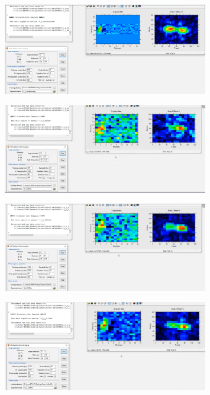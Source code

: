 \begin{figure}[H]
    \centering
    \includegraphics[width = 0.8\textwidth]{Screenshot2/14_2ersteMessung.jpg}
\end{figure}

\begin{figure}[H]
    \centering
    \includegraphics[width = 0.8\textwidth]{Screenshot2/14_2_600ms.jpg}
\end{figure}

\begin{figure}[H]
    \centering
    \includegraphics[width = 0.8\textwidth]{Screenshot2/14_2_1300ms.jpg}
\end{figure}


\begin{figure}[H]
    \centering
    \includegraphics[width = 0.8\textwidth]{Screenshot2/14_2_2100ms.jpg}
\end{figure}


